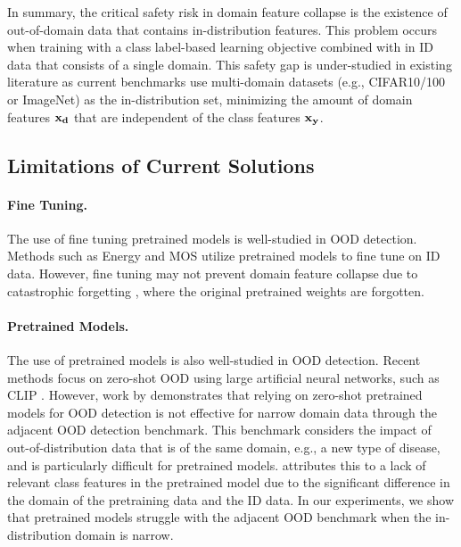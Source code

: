 \documentclass[letterpaper]{article} %
\theoremstyle{plain}
\theoremstyle{definition}
\theoremstyle{remark}
\begin{document}
In summary, the critical safety risk in domain feature collapse is the existence of out-of-domain data that contains in-distribution features. This problem occurs when training with a class label-based learning objective combined with in ID data that consists of a single domain. This safety gap is under-studied in existing literature as current benchmarks use multi-domain datasets (e.g., CIFAR10/100 or ImageNet) as the in-distribution set, minimizing the amount of domain features ${\mathbf{x}}_{\mathbf{d}}$ that are independent of the class features ${\mathbf{x}}_{\mathbf{y}}$. 

\subsection{Limitations of Current Solutions}

\paragraph{Fine Tuning.} The use of fine tuning pretrained models is well-studied in OOD detection. Methods such as Energy \citep{liu2020energy} and MOS \cite{huang2021mos} utilize pretrained models to fine tune on ID data. However, fine tuning may not prevent domain feature collapse due to catastrophic forgetting \cite{mccloskey1989catastrophic}, where the original pretrained weights are forgotten. 

\paragraph{Pretrained Models.} The use of pretrained models is also well-studied in OOD detection. Recent methods \cite{esmaeilpour2022zero} focus on zero-shot OOD using large artificial neural networks, such as CLIP \cite{radford2021learning}. However, work by \cite{yangcan} demonstrates that relying on zero-shot pretrained models for OOD detection is not effective for narrow domain data through the adjacent OOD detection benchmark. This benchmark considers the impact of out-of-distribution data that is of the same domain, e.g., a new type of disease, and is particularly difficult for pretrained models. \cite{yangcan} attributes this to a lack of relevant class features in the pretrained model due to the significant difference in the domain of the pretraining data and the ID data. In our experiments, we show that pretrained models struggle with the adjacent OOD benchmark when the in-distribution domain is narrow.
\end{document}
